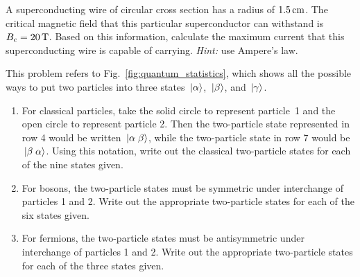 \begin{problem}
A superconducting wire of circular cross section has a radius of
$1.5\,\mbox{cm}$.  The critical magnetic field that this particular
superconductor can withstand is $B_c=20\,\mbox{T}$.  Based on this
information, calculate the maximum current that this superconducting
wire is capable of carrying.  \textit{Hint:} use Ampere's law.
\end{problem}


\begin{problem}
This problem refers to Fig.~\ref{fig:quantum_statistics}, which shows
all the possible ways to put two particles into three states $\,|\mbox{$\alpha$}\rangle$,
$\,|\mbox{$\beta$}\rangle$, and $\,|\mbox{$\gamma$}\rangle$.
\begin{enumerate}
\item For classical particles, take the solid circle to represent
  particle~1 and the open circle to represent particle 2.  Then the
  two-particle state represented in row 4 would be written
  $\,|\mbox{$\alpha\;\beta$}\rangle$, while the two-particle state in row 7 would
  be $\,|\mbox{$\beta\; \alpha$}\rangle$.  Using this notation, write out 
  the classical two-particle states for each of the nine states given.

\item For  bosons, the two-particle states must be symmetric under
interchange of particles 1 and 2.  Write out the appropriate two-particle
states for each of the six states given.

\item For fermions, the two-particle states must be antisymmetric under
interchange of particles 1 and 2.  Write out the appropriate two-particle
states for each of the three states given.


\end{enumerate}
\end{problem}

%



